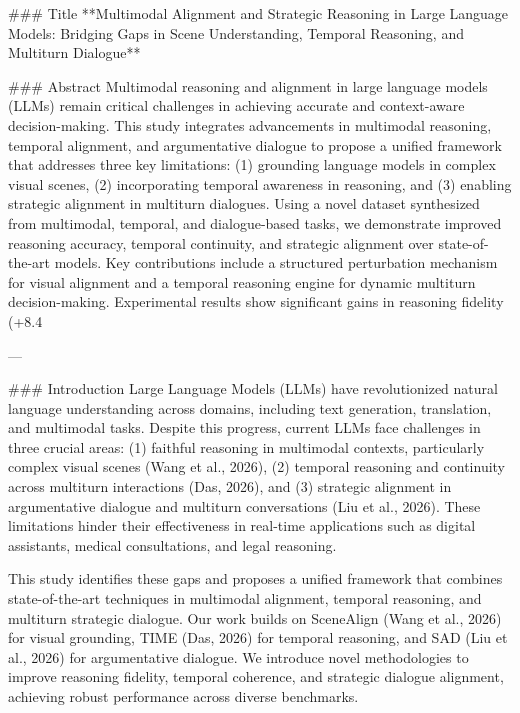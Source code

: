 ### Title  
**Multimodal Alignment and Strategic Reasoning in Large Language Models: Bridging Gaps in Scene Understanding, Temporal Reasoning, and Multiturn Dialogue**

### Abstract  
Multimodal reasoning and alignment in large language models (LLMs) remain critical challenges in achieving accurate and context-aware decision-making. This study integrates advancements in multimodal reasoning, temporal alignment, and argumentative dialogue to propose a unified framework that addresses three key limitations: (1) grounding language models in complex visual scenes, (2) incorporating temporal awareness in reasoning, and (3) enabling strategic alignment in multiturn dialogues. Using a novel dataset synthesized from multimodal, temporal, and dialogue-based tasks, we demonstrate improved reasoning accuracy, temporal continuity, and strategic alignment over state-of-the-art models. Key contributions include a structured perturbation mechanism for visual alignment and a temporal reasoning engine for dynamic multiturn decision-making. Experimental results show significant gains in reasoning fidelity (+8.4%

---

### Introduction  
Large Language Models (LLMs) have revolutionized natural language understanding across domains, including text generation, translation, and multimodal tasks. Despite this progress, current LLMs face challenges in three crucial areas: (1) faithful reasoning in multimodal contexts, particularly complex visual scenes (Wang et al., 2026), (2) temporal reasoning and continuity across multiturn interactions (Das, 2026), and (3) strategic alignment in argumentative dialogue and multiturn conversations (Liu et al., 2026). These limitations hinder their effectiveness in real-time applications such as digital assistants, medical consultations, and legal reasoning.  

This study identifies these gaps and proposes a unified framework that combines state-of-the-art techniques in multimodal alignment, temporal reasoning, and multiturn strategic dialogue. Our work builds on SceneAlign (Wang et al., 2026) for visual grounding, TIME (Das, 2026) for temporal reasoning, and SAD (Liu et al., 2026) for argumentative dialogue. We introduce novel methodologies to improve reasoning fidelity, temporal coherence, and strategic dialogue alignment, achieving robust performance across diverse benchmarks.  

